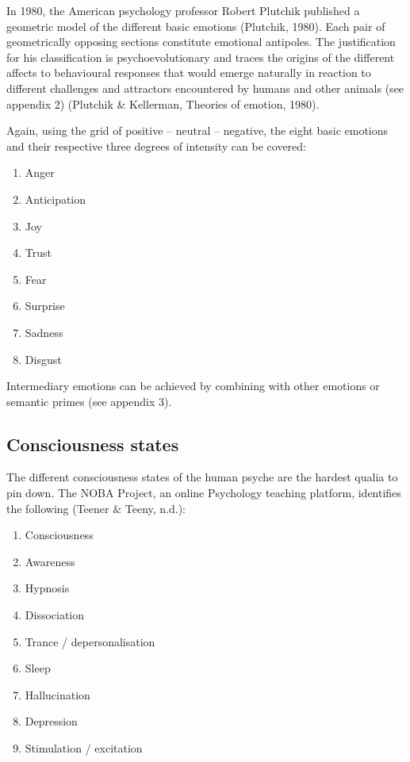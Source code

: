 \noindent In 1980, the American psychology professor Robert Plutchik published a geometric model of the different basic emotions  (Plutchik, 1980). Each pair of geometrically opposing sections constitute emotional antipoles. The justification for his classification is psychoevolutionary and traces the origins of the different affects to behavioural responses that would emerge naturally in reaction to different challenges and attractors encountered by humans and other animals (see appendix 2) (Plutchik \& Kellerman, Theories of emotion, 1980).  

Again, using the grid of positive – neutral – negative, the eight basic emotions and their respective three degrees of intensity can be covered: 

\begin{enumerate}
\item   Anger 

\item   Anticipation 

\item   Joy 

\item   Trust 

\item   Fear 

\item   Surprise 
	
\item   Sadness 

\item   Disgust
\end{enumerate}

Intermediary emotions can be achieved by combining with other emotions or semantic primes (see appendix 3). 

\subsection{Consciousness states}

The different consciousness states of the human psyche are the hardest qualia to pin down. The NOBA Project, an online Psychology teaching platform, identifies the following (Teener \& Teeny, n.d.): 

\begin{enumerate}
\item   Consciousness 

\item   Awareness 

\item   Hypnosis 

\item   Dissociation 

\item   Trance / depersonalisation 

\item   Sleep 

\item   Hallucination 

\item   Depression 

\item   Stimulation / excitation
\end{enumerate}
 


